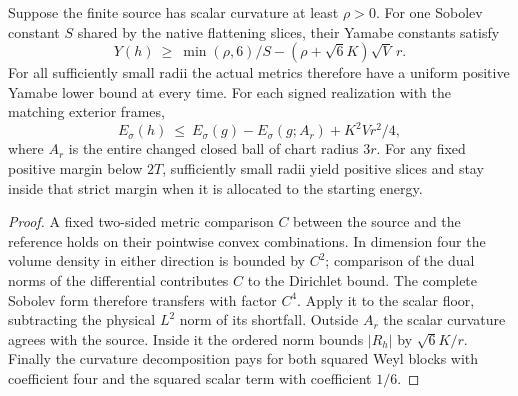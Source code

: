 \begin{proposition}
\label{prop:ed46-native-sign}
\leanok
Suppose the finite source has scalar curvature at least $\rho>0$.
For one Sobolev constant $S$ shared by the native flattening slices,
their Yamabe constants satisfy
\[
 Y(h)\ \ge\ \min(\rho,6)/S-(\rho+\sqrt6 K)\sqrt V\,r .
\]
For all sufficiently small radii the actual metrics therefore have a
uniform positive Yamabe lower bound at every time. For each signed
realization with the matching exterior frames,
\[
 E_\sigma(h)\ \le\ E_\sigma(g)-E_\sigma(g;A_r)+ K^2Vr^2/4 ,
\]
where $A_r$ is the entire changed closed ball of chart radius $3r$.
For any fixed positive margin below $2T$, sufficiently small radii
yield positive slices and stay inside that strict margin when it is
allocated to the starting energy.
\end{proposition}
\begin{proof}
\leanok
A fixed two-sided metric comparison $C$ between the source and the
reference holds on their pointwise convex combinations. In dimension
four the volume density in either direction is bounded by $C^2$;
comparison of the dual norms of the differential contributes $C$ to
the Dirichlet bound. The complete Sobolev form therefore transfers
with factor $C^4$. Apply it to the scalar floor, subtracting the
physical $L^2$ norm of its shortfall. Outside $A_r$ the scalar
curvature agrees with the source. Inside it the ordered norm bounds
$|R_h|$ by $\sqrt6 K/r$. Finally the curvature decomposition pays
for both squared Weyl blocks with coefficient four and the squared
scalar term with coefficient $1/6$.
\end{proof}

